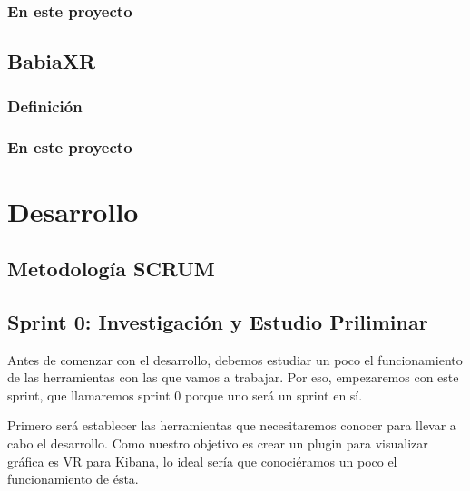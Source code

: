 \documentclass[a4paper, 12pt]{book}
\begin{document}
\subsection{En este proyecto}



\section{BabiaXR}
\label{sec:babiaxr}
\subsection{Definici\'on}
\subsection{En este proyecto}


\cleardoublepage
\chapter{Desarrollo}
\label{sec:desarrollo} 


\section{Metodolog\'ia SCRUM}
\label{sec:scrum}


\section{Sprint 0: Investigación y Estudio Priliminar }
\label{sec:sprint0}

Antes de comenzar con el desarrollo, debemos estudiar un poco el funcionamiento de las herramientas con las que vamos a trabajar. Por eso, empezaremos con este sprint, que llamaremos sprint 0 porque uno será un sprint en sí. 

Primero será establecer las herramientas que necesitaremos conocer para llevar a cabo el desarrollo. Como nuestro objetivo es crear un plugin para visualizar gráfica es VR para Kibana, lo ideal sería que conociéramos un poco el funcionamiento de ésta. 
\end{document}
